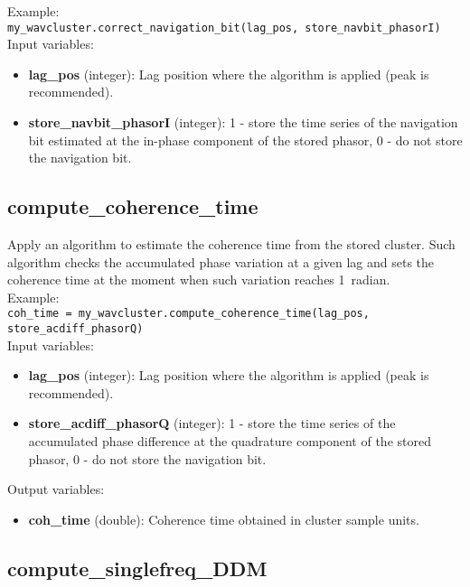 Example:\\

\texttt{my\_wavcluster.correct\_navigation\_bit(lag\_pos, store\_navbit\_phasorI)}\\

Input variables:
\begin{itemize}
\item {\bf lag\_pos} (integer): Lag position where the algorithm is applied (peak is recommended).
\item {\bf store\_navbit\_phasorI} (integer): 1 - store the time series of the navigation bit estimated at the in-phase component of the stored phasor, 0 - do not store the navigation bit.
\end{itemize}


\subsection{compute\_coherence\_time}

Apply an algorithm to estimate the coherence time from the stored cluster. Such algorithm checks the accumulated phase variation at a given lag and sets the coherence time at the moment when such variation reaches 1~radian.\\

Example:\\

\texttt{coh\_time = my\_wavcluster.compute\_coherence\_time(lag\_pos, store\_acdiff\_phasorQ)}\\

Input variables:
\begin{itemize}
\item {\bf lag\_pos} (integer): Lag position where the algorithm is applied (peak is recommended).
\item {\bf store\_acdiff\_phasorQ} (integer): 1 - store the time series of the accumulated phase difference at the quadrature component of the stored phasor, 0 - do not store the navigation bit.
\end{itemize}

Output variables:
\begin{itemize}
\item {\bf coh\_time} (double): Coherence time obtained in cluster sample units.
\end{itemize}


\subsection{compute\_singlefreq\_DDM}

